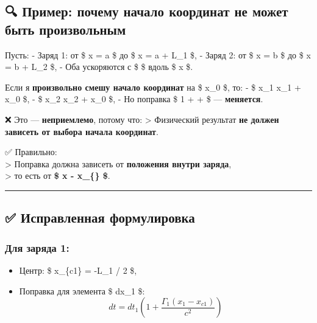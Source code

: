 \documentclass[11pt]{article}
\providecommand{\tightlist}{%
      \setlength{\itemsep}{0pt}\setlength{\parskip}{0pt}}
\begin{document}
\subsection{🔍 Пример: почему начало координат не может быть
произвольным}\label{ux43fux440ux438ux43cux435ux440-ux43fux43eux447ux435ux43cux443-ux43dux430ux447ux430ux43bux43e-ux43aux43eux43eux440ux434ux438ux43dux430ux442-ux43dux435-ux43cux43eux436ux435ux442-ux431ux44bux442ux44c-ux43fux440ux43eux438ux437ux432ux43eux43bux44cux43dux44bux43c}

Пусть: - Заряд 1: от \$ x = a \$ до \$ x = a + L\_1 \$, - Заряд 2: от \$
x = b \$ до \$ x = b + L\_2 \$, - Оба ускоряются с \$ \Gamma \$ вдоль \$
x \$.

Если я \textbf{произвольно смешу начало координат} на \$ x\_0 \$, то: -
\$ x\_1 \to x\_1 + x\_0 \$, - \$ x\_2 \to x\_2 + x\_0 \$, - Но поправка
\$ 1 +   +  \$ ---
\textbf{меняется}.

❌ Это --- \textbf{неприемлемо}, потому что: \textgreater{} Физический
результат \textbf{не должен зависеть от выбора начала координат}.

✅ Правильно:\\
\textgreater{} Поправка должна зависеть от \textbf{положения внутри
заряда},\\
\textgreater{} то есть от \textbf{\$ x - x\_\{\} \$}.

\begin{center}\rule{0.5\linewidth}{\linethickness}\end{center}

\subsection{✅ Исправленная
формулировка}\label{ux438ux441ux43fux440ux430ux432ux43bux435ux43dux43dux430ux44f-ux444ux43eux440ux43cux443ux43bux438ux440ux43eux432ux43aux430}

\subsubsection{Для заряда
1:}\label{ux434ux43bux44f-ux437ux430ux440ux44fux434ux430-1}

\begin{itemize}
\tightlist
\item
  Центр: \$ x\_\{c1\} = -L\_1 / 2 \$,
\item
  Поправка для элемента \$ dx\_1 \$:\\
  \[
  dt = dt_1 \left( 1 + \frac{\Gamma_1 (x_1 - x_{c1})}{c^2} \right)
  \]
\end{itemize}
\end{document}
